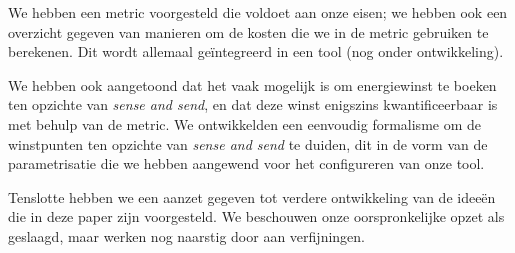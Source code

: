 \documentclass{article}
\begin{document}
We hebben een metric voorgesteld die voldoet aan onze eisen; we hebben ook een
overzicht gegeven van manieren om de kosten die we in de metric gebruiken te
berekenen. Dit wordt allemaal ge\"integreerd in een tool (nog onder
ontwikkeling).

We hebben ook aangetoond dat het vaak mogelijk is om energiewinst te boeken ten
opzichte van \textit{sense and send}, en dat deze winst enigszins
kwantificeerbaar is met behulp van de metric. We ontwikkelden een eenvoudig
formalisme om de winstpunten ten opzichte van \textit{sense and send} te duiden,
dit in de vorm van de parametrisatie die we hebben aangewend voor het
configureren van onze tool.

Tenslotte hebben we een aanzet gegeven tot verdere ontwikkeling van de idee\"en
die in deze paper zijn voorgesteld. We beschouwen onze oorspronkelijke opzet als
geslaagd, maar werken nog naarstig door aan verfijningen.


\nocite{*}


\end{document}

